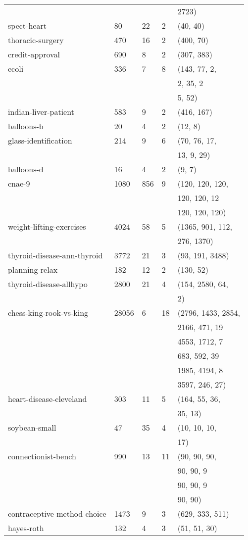 \documentclass{article}%
\begin{document}
\begin{longtable}{l l l l l}
&&&&2723)\\%
spect{-}heart&80&22&2&(40, 40)\\%
thoracic{-}surgery&470&16&2&(400, 70)\\%
credit{-}approval&690&8&2&(307, 383)\\%
ecoli&336&7&8&(143, 77, 2,\\%
&&&&2, 35, 2\\%
&&&&5, 52)\\%
indian{-}liver{-}patient&583&9&2&(416, 167)\\%
balloons{-}b&20&4&2&(12, 8)\\%
glass{-}identification&214&9&6&(70, 76, 17,\\%
&&&&13, 9, 29)\\%
balloons{-}d&16&4&2&(9, 7)\\%
cnae{-}9&1080&856&9&(120, 120, 120,\\%
&&&&120, 120, 12\\%
&&&&120, 120, 120)\\%
weight{-}lifting{-}exercises&4024&58&5&(1365, 901, 112,\\%
&&&&276, 1370)\\%
thyroid{-}disease{-}ann{-}thyroid&3772&21&3&(93, 191, 3488)\\%
planning{-}relax&182&12&2&(130, 52)\\%
thyroid{-}disease{-}allhypo&2800&21&4&(154, 2580, 64,\\%
&&&&2)\\%
chess{-}king{-}rook{-}vs{-}king&28056&6&18&(2796, 1433, 2854,\\%
&&&&2166, 471, 19\\%
&&&&4553, 1712, 7\\%
&&&&683, 592, 39\\%
&&&&1985, 4194, 8\\%
&&&&3597, 246, 27)\\%
heart{-}disease{-}cleveland&303&11&5&(164, 55, 36,\\%
&&&&35, 13)\\%
soybean{-}small&47&35&4&(10, 10, 10,\\%
&&&&17)\\%
connectionist{-}bench&990&13&11&(90, 90, 90,\\%
&&&&90, 90, 9\\%
&&&&90, 90, 9\\%
&&&&90, 90)\\%
contraceptive{-}method{-}choice&1473&9&3&(629, 333, 511)\\%
hayes{-}roth&132&4&3&(51, 51, 30)\\%

\end{longtable}
\end{document}
